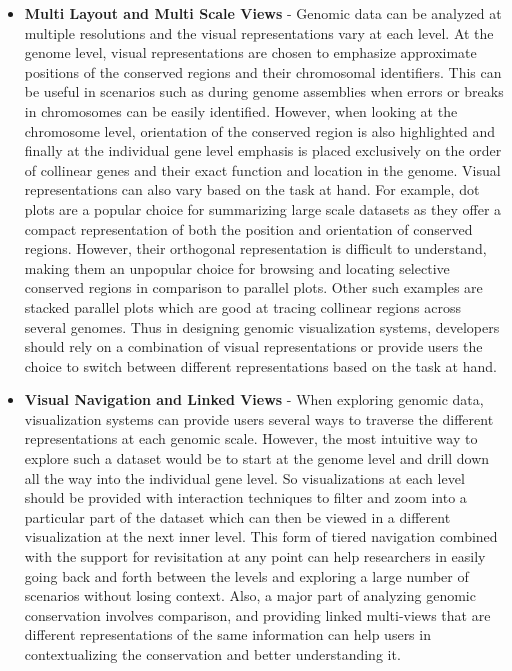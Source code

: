 \begin{itemize}
    \item \textbf{Multi Layout and Multi Scale Views} - 
    Genomic data can be analyzed at multiple resolutions and the visual representations vary at each level. At the genome level, visual representations are chosen to emphasize approximate positions of the conserved regions and their chromosomal identifiers. This can be useful in scenarios such as during genome assemblies when errors or breaks in chromosomes can be easily identified. However, when looking at the chromosome level, orientation of the conserved region is also highlighted and finally at the individual gene level emphasis is placed exclusively on the order of collinear genes and their exact function and location in the genome. Visual representations can also vary based on the task at hand. For example, dot plots are a popular choice for summarizing large scale datasets as they offer a compact representation of both the position and orientation of conserved regions. However, their orthogonal representation is difficult to understand, making them an unpopular choice for browsing and locating selective conserved regions in comparison to parallel plots. Other such examples are stacked parallel plots which are good at tracing collinear regions across several genomes. Thus in designing genomic visualization systems, developers should rely on a combination of visual representations or provide users the choice to switch between different representations based on the task at hand. 

    \item \textbf{Visual Navigation and Linked Views} - When exploring genomic data, visualization systems can provide users several ways to traverse the different representations at each genomic scale. However, the most intuitive way to explore such a dataset would be to start at the genome level and drill down all the way into the individual gene level. So visualizations at each level should be provided with interaction techniques to filter and zoom into a particular part of the dataset which can then be viewed in a different visualization at the next inner level. This form of tiered navigation combined with the support for revisitation at any point can help researchers in easily going back and forth between the levels and exploring a large number of scenarios without losing context. Also, a major part of analyzing genomic conservation involves comparison, and providing linked multi-views that are different representations of the same information can help users in contextualizing the conservation and better understanding it.
    

\end{itemize}
